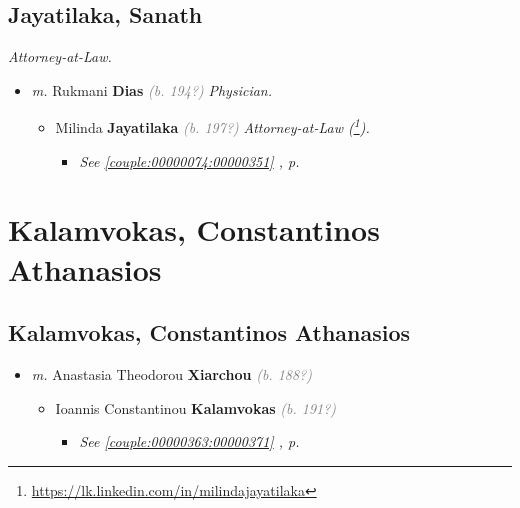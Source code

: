 \documentclass[10pt, openany]{book}
\begin{document}
\chapter{Jayatilaka, Sanath}
\label{00000352}
\textcolor{slmaroon}{\textit{Attorney-at-Law.}}
\begin{itemize}
\item{\textit{m.} Rukmani \textbf{Dias} \textcolor{gray}{\textit{(b. 194?)}} \textcolor{slmaroon}{\textit{Physician.}}   \label{couple:00000352:00002585} \begin{itemize}
\item{Milinda \textbf{Jayatilaka} \textcolor{gray}{\textit{(b. 197?)}} \textcolor{slmaroon}{\textit{Attorney-at-Law (\footnote{\url{https://lk.linkedin.com/in/milindajayatilaka}}).}}
\begin{itemize}
\item{\textcolor{slteal}{\textit{See  \autoref{couple:00000074:00000351} \textit{, p. \pageref{couple:00000074:00000351} }}}}
\end{itemize}
 }
\end{itemize}}
\end{itemize}
 
\part{Kalamvokas, Constantinos Athanasios}
\chapter{Kalamvokas, Constantinos Athanasios}
\label{00000368}
\textcolor{slmaroon}{\textit{}}
\begin{itemize}
\item{\textit{m.} Anastasia Theodorou \textbf{Xiarchou} \textcolor{gray}{\textit{(b. 188?)}}   \label{couple:00000368:00001032} \begin{itemize}
\item{Ioannis Constantinou \textbf{Kalamvokas} \textcolor{gray}{\textit{(b. 191?)}}
\begin{itemize}
\item{\textcolor{slteal}{\textit{See  \autoref{couple:00000363:00000371} \textit{, p. \pageref{couple:00000363:00000371} }}}}
\end{itemize}
  }
\end{itemize}}
\end{itemize}
  
\end{document}
